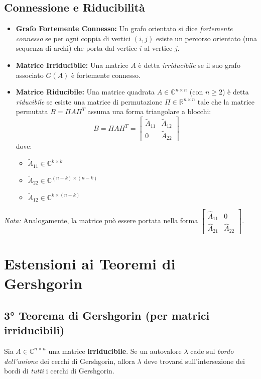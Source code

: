 \documentclass[a4paper,12pt]{article}
\begin{document}
	\subsection{Connessione e Riducibilità}
	\begin{itemize}
		\item \textbf{Grafo Fortemente Connesso:} Un grafo orientato si dice \textit{fortemente connesso} se per ogni coppia di vertici $(i, j)$ esiste un percorso orientato (una sequenza di archi) che porta dal vertice $i$ al vertice $j$.
		\item \textbf{Matrice Irriducibile:} Una matrice $A$ è detta \textit{irriducibile} se il suo grafo associato $G(A)$ è fortemente connesso.
		\item \textbf{Matrice Riducibile:} Una matrice quadrata $A \in \mathbb{C}^{n \times n}$ (con $n \ge 2$) è detta \textit{riducibile} se esiste una matrice di permutazione $\Pi \in \mathbb{R}^{n \times n}$ tale che la matrice permutata $B = \Pi A \Pi^T$ assuma una forma triangolare a blocchi:
		\begin{equation}
			B = \Pi A \Pi^T = \begin{bmatrix} \tilde{A}_{11} & \tilde{A}_{12} \\ 0 & \tilde{A}_{22} \end{bmatrix}
		\end{equation}
		dove:
		\begin{itemize}
			\item $\tilde{A}_{11} \in \mathbb{C}^{k \times k}$
			\item $\tilde{A}_{22} \in \mathbb{C}^{(n-k) \times (n-k)}$
			\item $\tilde{A}_{12} \in \mathbb{C}^{k \times (n-k)}$
		\end{itemize}
	\end{itemize}
	\textit{Nota:} Analogamente, la matrice può essere portata nella forma $\begin{bmatrix} \hat{A}_{11} & 0 \\ \hat{A}_{21} & \hat{A}_{22} \end{bmatrix}$.
	
	\section{Estensioni ai Teoremi di Gershgorin}
	
	\subsection{3° Teorema di Gershgorin (per matrici irriducibili)}
	\begin{tcolorbox}[title=3° Teorema di Gershgorin, colback=blue!5!white, colframe=blue!75!black]
		Sia $A \in \mathbb{C}^{n \times n}$ una matrice \textbf{irriducibile}. Se un autovalore $\lambda$ cade sul \textit{bordo dell'unione} dei cerchi di Gershgorin, allora $\lambda$ deve trovarsi sull'intersezione dei bordi di \textit{tutti} i cerchi di Gershgorin.
	\end{tcolorbox}
	
\end{document}
